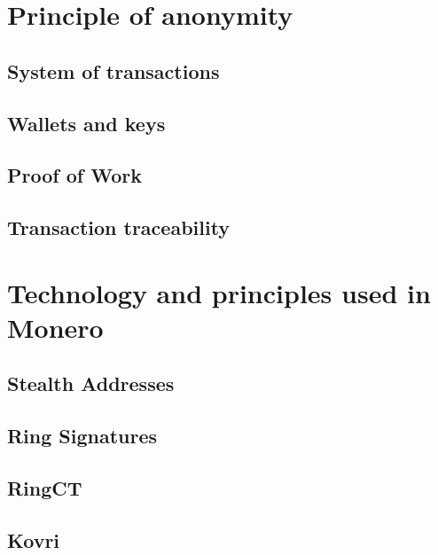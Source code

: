 \documentclass[
  printed, %
  table,   %
  nolof,     %
  nolot,     %
           oneside, color
]{fithesis3}
\begin{document}
\section{Principle of anonymity}

\subsection{System of transactions}

\subsection{Wallets and keys}

\subsection{Proof of Work}

\subsection{Transaction traceability}

\section{Technology and principles used in Monero}

\subsection{Stealth Addresses}

\subsection{Ring Signatures}

\subsection{RingCT}

\subsection{Kovri}
\end{document}

